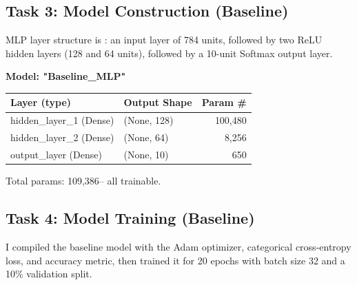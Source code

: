 \documentclass[11pt]{article}
\begin{document}
\subsection*{Task 3: Model Construction (Baseline)}
MLP layer structure is  : an input
layer of 784 units, followed by two ReLU hidden layers (128 and 64 units), followed by a 10-unit
Softmax output layer.

\textbf{Model: "Baseline\_MLP"}

\begin{center}
\begin{tabular}{|l|l|r|}
\hline
\textbf{Layer (type)} & \textbf{Output Shape} & \textbf{Param \#} \\ \hline
hidden\_layer\_1 (Dense) & (None, 128) & 100,480 \\ \hline
hidden\_layer\_2 (Dense) & (None, 64)  & 8,256   \\ \hline
output\_layer (Dense)    & (None, 10)  & 650     \\ \hline
\end{tabular}
\end{center}

Total params: 109,386-- all trainable.

\subsection*{Task 4: Model Training (Baseline)}
I compiled the baseline model with the Adam optimizer, categorical cross-entropy loss, and
accuracy metric, then trained it for 20 epochs with batch size 32 and a 10\% validation split.
\end{document}
